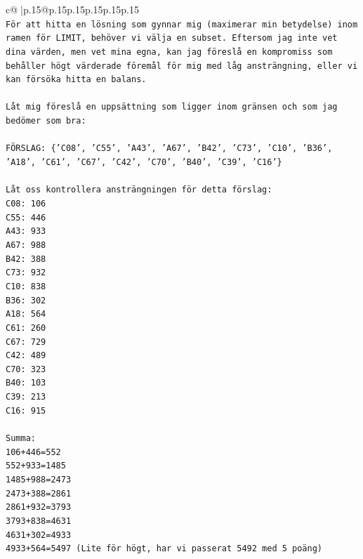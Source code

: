 \documentclass{article}
\begin{document}
{\begin{supertabular}{c@{$\;$}|p{.15\linewidth}@{}p{.15\linewidth}p{.15\linewidth}p{.15\linewidth}p{.15\linewidth}p{.15\linewidth}}
{{{\\ 
\texttt{För att hitta en lösning som gynnar mig (maximerar min betydelse) inom ramen för LIMIT, behöver vi välja en subset. Eftersom jag inte vet dina värden, men vet mina egna, kan jag föreslå en kompromiss som behåller högt värderade föremål för mig med låg ansträngning, eller vi kan försöka hitta en balans.} \\
\\ 
\texttt{Låt mig föreslå en uppsättning som ligger inom gränsen och som jag bedömer som bra:} \\
\\ 
\texttt{FÖRSLAG: \{'C08', 'C55', 'A43', 'A67', 'B42', 'C73', 'C10', 'B36', 'A18', 'C61', 'C67', 'C42', 'C70', 'B40', 'C39', 'C16'\}} \\
\\ 
\texttt{Låt oss kontrollera ansträngningen för detta förslag:} \\
\texttt{C08: 106} \\
\texttt{C55: 446} \\
\texttt{A43: 933} \\
\texttt{A67: 988} \\
\texttt{B42: 388} \\
\texttt{C73: 932} \\
\texttt{C10: 838} \\
\texttt{B36: 302} \\
\texttt{A18: 564} \\
\texttt{C61: 260} \\
\texttt{C67: 729} \\
\texttt{C42: 489} \\
\texttt{C70: 323} \\
\texttt{B40: 103} \\
\texttt{C39: 213} \\
\texttt{C16: 915} \\
\\ 
\texttt{Summa:} \\
\texttt{106+446=552} \\
\texttt{552+933=1485} \\
\texttt{1485+988=2473} \\
\texttt{2473+388=2861} \\
\texttt{2861+932=3793} \\
\texttt{3793+838=4631} \\
\texttt{4631+302=4933} \\
\texttt{4933+564=5497 (Lite för högt, har vi passerat 5492 med 5 poäng)} \\
}}}
\end{supertabular}}
\end{document}
